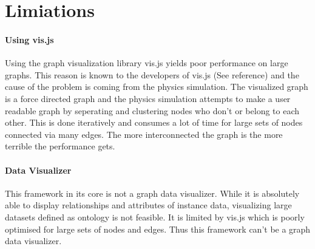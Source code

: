 \section{Limiations}

\paragraph{Using vis.js}
Using the graph visualization library vis.js yields poor performance on large graphs.
This reason is known to the developers of vis.js (See reference) and the cause of the problem is coming
from the physics simulation. The visualized graph is a force directed graph and the physics simulation attempts to make a user readable graph 
by seperating and clustering nodes who don't or belong to each other. This is done iteratively and consumes a lot of time for large sets of nodes
connected via many edges. The more interconnected the graph is the more terrible the performance gets. 

\paragraph{Data Visualizer}
This framework in its core is not a graph data visualizer. While it is absolutely able to display relationships and attributes of instance data, visualizing 
large datasets defined as ontology is not feasible. It is limited by vis.js which is poorly optimised for large sets of nodes and edges. 
Thus this framework can't be a graph data visualizer. 